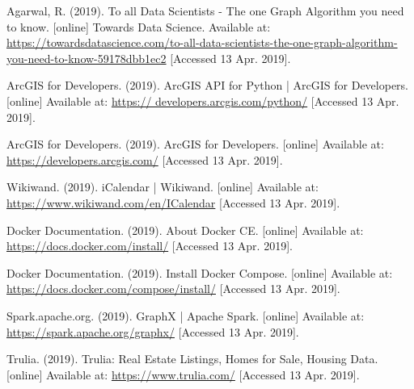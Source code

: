 \documentclass[11 pt]{article}
\theoremstyle{definition}
\theoremstyle{definition}
\begin{document}
\newpage
\begin{thebibliography}{99}

Agarwal, R. (2019). To all Data Scientists - The one Graph Algorithm you need to know. [online] Towards Data Science. Available at: \url{https://towardsdatascience.com/to-all-data-scientists-the-one-graph-algorithm-you-need-to-know-59178dbb1ec2} [Accessed 13 Apr. 2019].

ArcGIS for Developers. (2019). ArcGIS API for Python | ArcGIS for Developers. [online] Available at: \url{https://
developers.arcgis.com/python/} [Accessed 13 Apr. 2019].

ArcGIS for Developers. (2019). ArcGIS for Developers. [online] Available at: \url{https://developers.arcgis.com/} [Accessed 13 Apr. 2019].

Wikiwand. (2019). iCalendar | Wikiwand. [online] Available at: \url{https://www.wikiwand.com/en/ICalendar} [Accessed 13 Apr. 2019].
  
Docker Documentation. (2019). About Docker CE. [online] Available at: \url{https://docs.docker.com/install/} [Accessed 13 Apr. 2019].

Docker Documentation. (2019). Install Docker Compose. [online] Available at: \url{https://docs.docker.com/compose/install/} [Accessed 13 Apr. 2019].
  
Spark.apache.org. (2019). GraphX | Apache Spark. [online] Available at: \url{https://spark.apache.org/graphx/} [Accessed 13 Apr. 2019].

Trulia. (2019). Trulia: Real Estate Listings, Homes for Sale, Housing Data. [online] Available at: \url{https://www.trulia.com/} [Accessed 13 Apr. 2019].
\end{thebibliography}
\end{document}
